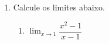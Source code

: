 \documentclass[a4paper, 12pt]{article}
\newcommand{\limite}{\displaystyle\lim}
\begin{document}
\begin{enumerate}
\item Calcule os limites abaixo.
\begin{enumerate}
\item $\limite_{x \to 1} \dfrac{x^2-1}{x-1}$
\end{enumerate}
\end{enumerate}
\end{document}
